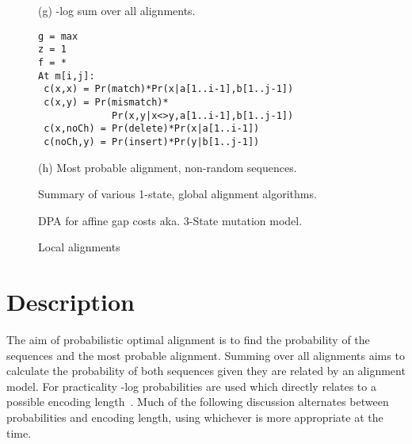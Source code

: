 \documentclass[letterpaper,11pt,oneside]{article}
\begin{document}
\begin{figure}
\begin{minipage}{\textwidth}
\begin{multicols}{2}
(g) -log sum over all alignments.


\begin{verbatim}
g = max
z = 1
f = *
At m[i,j]:
 c(x,x) = Pr(match)*Pr(x|a[1..i-1],b[1..j-1])
 c(x,y) = Pr(mismatch)*
             Pr(x,y|x<>y,a[1..i-1],b[1..j-1])
 c(x,noCh) = Pr(delete)*Pr(x|a[1..i-1])
 c(noCh,y) = Pr(insert)*Pr(y|b[1..j-1])
\end{verbatim}

(h) Most probable alignment, non-random sequences.

\end{multicols}
\end{minipage}
\caption{\label{fig:algs}Summary of various 1-state, global alignment algorithms.}
\end{figure}

\begin{figure}
\begin{multicols}{2}

\centering
{}
\caption{\label{fig:3state}DPA for affine gap costs aka. 3-State mutation model.}

\pagebreak

\centering
{}
\caption{\label{fig:local}Local alignments}

\end{multicols}
\end{figure}


\section{Description}

The aim of probabilistic optimal alignment is to find the probability of the
sequences and the most probable alignment.  Summing over all alignments aims
to calculate the probability of both sequences given they are related by an
alignment model.  For practicality -log probabilities are used which directly
relates to a possible encoding length~\cite{shannon48}.  Much of the following
discussion alternates between probabilities and encoding length, using
whichever is more appropriate at the time.
\end{document}
